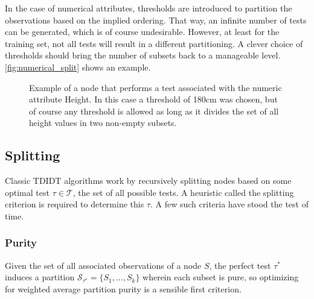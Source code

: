In the case of numerical attributes, thresholds are introduced to partition the observations based on the implied ordering. That way, an infinite number of tests can be generated, which is of course undesirable. However, at least for the training set, not all tests will result in a different partitioning. A clever choice of thresholds should bring the number of subsets back to a manageable level. \autoref{fig:numerical_split} shows an example.

\begin{figure}[htp]%
\label{fig:numerical_split}
\begin{center}
\end{center}
\caption{Example of a node that performs a test associated with the numeric attribute Height. In this case a threshold of 180cm was chosen, but of course any threshold is allowed as long as it divides the set of all height values in two non-empty subsets.}
\end{figure}


\subsection{Splitting}
Classic TDIDT algorithms work by recursively splitting nodes based on some optimal test $\tau \in \mathcal{T}$, the set of all possible tests. A heuristic called the splitting criterion is required to determine this $\tau$. A few such criteria have stood the test of time.

\subsubsection{Purity}
Given the set of all associated observations of a node $S$, the perfect test $\tau^*$ induces a partition $\mathcal{S}_{\tau^*} = \{S_1, \ldots, S_k\}$ wherein each subset is pure, so optimizing for weighted average partition purity is a sensible first criterion.

